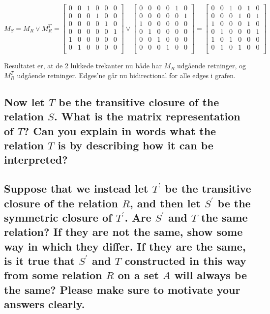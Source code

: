 \documentclass[a4paper,12pt]{article}
\begin{document}
\[M_S = M_R \lor M_{R}^T = 
    \begin{bmatrix}
        0 & 0 & 1 & 0 & 0 & 0 \\
        0 & 0 & 0 & 1 & 0 & 0 \\
        0 & 0 & 0 & 0 & 1 & 0 \\
        0 & 0 & 0 & 0 & 0 & 1 \\
        1 & 0 & 0 & 0 & 0 & 0 \\
        0 & 1 & 0 & 0 & 0 & 0 \\
    \end{bmatrix}
    \lor
    \begin{bmatrix}
        0 & 0 & 0 & 0 & 1 & 0 \\
        0 & 0 & 0 & 0 & 0 & 1 \\
        1 & 0 & 0 & 0 & 0 & 0 \\
        0 & 1 & 0 & 0 & 0 & 0 \\
        0 & 0 & 1 & 0 & 0 & 0 \\
        0 & 0 & 0 & 1 & 0 & 0 \\
    \end{bmatrix}
    = 
    \begin{bmatrix}
        0 & 0 & 1 & 0 & 1 & 0 \\
        0 & 0 & 0 & 1 & 0 & 1 \\
        1 & 0 & 0 & 0 & 1 & 0 \\
        0 & 1 & 0 & 0 & 0 & 1 \\
        1 & 0 & 1 & 0 & 0 & 0 \\
        0 & 1 & 0 & 1 & 0 & 0 \\
    \end{bmatrix}
\]

Resultatet er, at de 2 lukkede trekanter nu både har $M_R$ udgående retninger, og $M^T_{R}$ udgående retninger. Edges'ne går nu bidirectional for alle edges i grafen.

\subsection[]{Now let $T$ be the transitive closure of the relation $S$. What is the matrix representation of $T$? 
Can you explain in words what the relation $T$ is by describing how it can be interpreted?
}



\subsection[]{Suppose that we instead let $T^\prime$ be the transitive closure of the relation $R$, and then let
$S^\prime$ be the symmetric closure of $T^\prime$. Are $S^\prime$ and $T$ the same relation? If they are not the
same, show some way in which they differ. If they are the same, is it true that $S^\prime$ and $T$
constructed in this way from some relation $R$ on a set $A$ will always be the same? Please
make sure to motivate your answers clearly.
}
\end{document}
